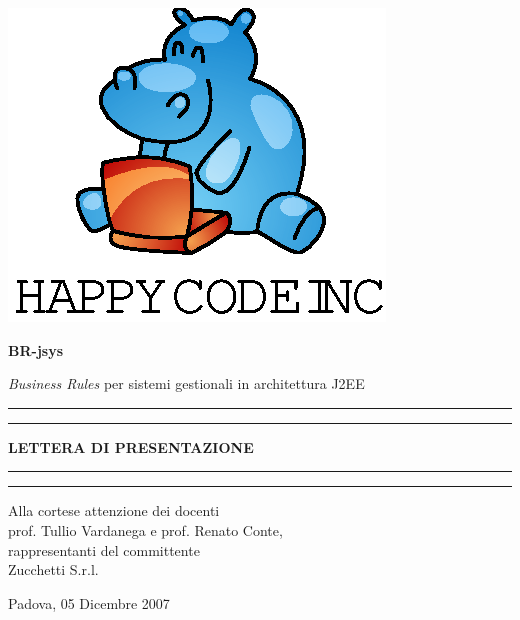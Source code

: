 \documentclass[11pt,titlepage,a4paper]{report}
\begin{document}
\begin{titlepage}
\begin{center}
\vspace*{0.5in}
\includegraphics{logo.eps}
\vspace*{0.2in}

{\Large \textbf{BR-jsys}}

{\Large \emph{Business Rules} per sistemi gestionali in architettura J2EE } 
\vspace{1.3in}
\par\rule{10cm}{.4pt} \par
\par\rule{12cm}{1pt} \par
\vspace*{0.5in}
\LARGE \textbf {LETTERA DI PRESENTAZIONE}
\vspace*{0.5in}
\par\rule{12cm}{1pt} \par
\par\rule{10cm}{.4pt} \par

\end{center}
\end{titlepage}
\vspace*{0.5in}

\thispagestyle{plain}
\begin{flushright}
Alla cortese attenzione dei docenti\\
prof. Tullio Vardanega e prof. Renato Conte,\\
rappresentanti del committente\\
Zucchetti S.r.l.
\end{flushright}
Padova, 05 Dicembre 2007\\
\end{document}
